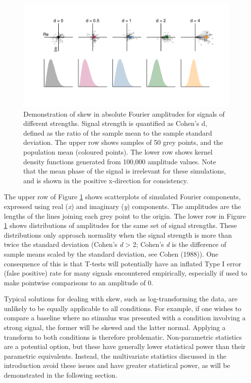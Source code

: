 \documentclass[]{article}
\begin{document}
\begin{figure}

{\centering \includegraphics{figures/amphists} 

}

\caption{Demonstration of skew in absolute Fourier amplitudes for signals of different strengths. Signal strength is quantified as Cohen's d, defined as the ratio of the sample mean to the sample standard deviation. The upper row shows samples of 50 grey points, and the population mean (coloured points). The lower row shows kernel density functions generated from 100,000 amplitude values. Note that the mean phase of the signal is irrelevant for these simulations, and is shown in the positive x-direction for consistency.}\label{fig:amphists}
\end{figure}

The upper row of Figure \ref{fig:amphists} shows scatterplots of simulated Fourier components, expressed using real (\emph{x}) and imaginary (\emph{y}) components. The amplitudes are the lengths of the lines joining each grey point to the origin. The lower row in Figure \ref{fig:amphists} shows distributions of amplitudes for the same set of signal strengths. These distributions only approach normality when the signal strength is more than twice the standard deviation (Cohen's \emph{d} \textgreater{} 2; Cohen's \emph{d} is the difference of sample means scaled by the standard deviation, see Cohen (1988)). One consequence of this is that T-tests will potentially have an inflated Type I error (false positive) rate for many signals encountered empirically, especially if used to make pointwise comparisons to an amplitude of 0.

Typical solutions for dealing with skew, such as log-transforming the data, are unlikely to be equally applicable to all conditions. For example, if one wishes to compare a baseline where no stimulus was presented with a condition involving a strong signal, the former will be skewed and the latter normal. Applying a transform to both conditions is therefore problematic. Non-parametric statistics are a potential option, but these have generally lower statistical power than their parametric equivalents. Instead, the multivariate statistics discussed in the introduction avoid these issues and have greater statistical power, as will be demonstrated in the following section.
\end{document}
